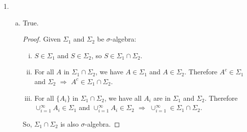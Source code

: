 \documentclass[11pt]{article}
\begin{document}
\begin{enumerate}[1.]
\begin{enumerate}[(a)]
\begin{proof}
\begin{enumerate}[i.]
                So that $A \sup B \in \mathcal{C}$.
            \end{enumerate}
            Therefore $\mathcal{C}$ is an algebra, which ends the proof.
        \end{proof}
        
        \item
        $\sigma(\mathcal{A})$ is the Borel $\sigma$-algebra of $(0,1]$, denote it by $\mathcal{B}_{(0,1]}$.
        \begin{proof}
            For all $(x,y] \in \mathcal{A}$: If $y = 1$, $(x,1]$ is open in $(0,1]$, so $(x,1] \in \mathcal{B}_{(0,1]}$; 
            Else $(x,y] = \cap_{n=1}^\infty (x, y+\frac{1-y}{n})$.
            
            Therefore $(x,y] \in \mathcal{B}_{(0,1]} \Rightarrow \mathcal{A} \subset \mathcal{B}_{(0,1]} \Rightarrow \sigma(\mathcal{A}) \subset \mathcal{B}_{(0,1]}$

            On the other side, for all $A$ open interval relative to $(0,1]$: $A = (x,1] \in \mathcal{A}$ or $A = (x,y) = \cup_{n=1}^\infty (x,y-\frac{y-x}{n}] \in \sigma(\mathcal{A})$.
            Therefore $A \in \sigma(\mathcal{A}) \Rightarrow \mathcal{B}_{(0,1]} \subset \sigma(\mathcal{A})$.
            
            So $\sigma(\mathcal{A}) = \mathcal{B}_{(0,1]}$.
        \end{proof} 
    \end{enumerate}
    
    \item 
    \begin{enumerate}[(a)]
        \item
        True.
        \begin{proof}
            Given $\Sigma_1$ and $\Sigma_2$ be $\sigma$-algebra:
            \begin{enumerate}[i.]
                \item
                $S \in \Sigma_1$ and $S \in \Sigma_2$, so $S \in \Sigma_1 \cap \Sigma_2$.
                \item
                For all $A$ in $\Sigma_1 \cap \Sigma_2$, we have $A \in \Sigma_1$ and $A \in \Sigma_2$. 
                Therefore $A^c \in \Sigma_1$ and $\Sigma_2$ $\Rightarrow$ $A^c \in \Sigma_1 \cap \Sigma_2$.
                \item
                For all $\{A_i\}$ in $\Sigma_1 \cap \Sigma_2$, we have all $A_i$ are in $\Sigma_1$ and $\Sigma_2$. 
                Therefore $\cup_{i=1}^\infty A_i \in \Sigma_1$ and $\cup_{i=1}^\infty A_i \in \Sigma_2$ $\Rightarrow$ $\cup_{i=1}^\infty \in \Sigma_1 \cap \Sigma_2$.
            \end{enumerate}
            So, $\Sigma_1 \cap \Sigma_2$ is also $\sigma$-algebra.
        \end{proof}
        

\end{enumerate}
\end{enumerate}
\end{document}
